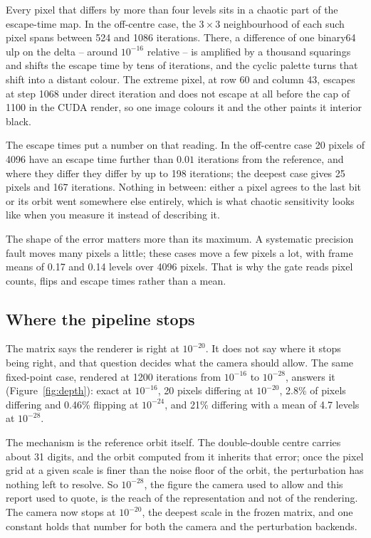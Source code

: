 \documentclass[10pt,a4paper]{article}
\begin{document}
Every pixel that differs by more than four levels sits in a chaotic part of the
escape-time map. In the off-centre case, the \(3\times3\) neighbourhood of each
such pixel spans between 524 and 1086 iterations. There, a difference of one
binary64 ulp on the delta -- around \(10^{-16}\) relative -- is amplified by a
thousand squarings and shifts the escape time by tens of iterations, and the
cyclic palette turns that shift into a distant colour. The extreme pixel, at
row 60 and column 43, escapes at step 1068 under direct iteration and does not
escape at all before the cap of 1100 in the CUDA render, so one image colours
it and the other paints it interior black.

The escape times put a number on that reading. In the off-centre case 20 pixels
of 4096 have an escape time further than \(0.01\) iterations from the
reference, and where they differ they differ by up to 198 iterations; the
deepest case gives 25 pixels and 167 iterations. Nothing in between: either a
pixel agrees to the last bit or its orbit went somewhere else entirely, which
is what chaotic sensitivity looks like when you measure it instead of
describing it.

The shape of the error matters more than its maximum. A systematic precision
fault moves many pixels a little; these cases move a few pixels a lot, with
frame means of 0.17 and 0.14 levels over 4096 pixels. That is why the gate
reads pixel counts, flips and escape times rather than a mean.

\subsection{Where the pipeline stops}
\label{sec:depth}

The matrix says the renderer is right at \(10^{-20}\). It does not say where it
stops being right, and that question decides what the camera should allow. The
same fixed-point case, rendered at 1200 iterations from \(10^{-16}\) to
\(10^{-28}\), answers it (Figure~\ref{fig:depth}): exact at \(10^{-16}\), 20
pixels differing at \(10^{-20}\), 2.8\% of pixels differing and 0.46\% flipping
at \(10^{-24}\), and 21\% differing with a mean of 4.7 levels at \(10^{-28}\).

The mechanism is the reference orbit itself. The double-double centre carries
about 31 digits, and the orbit computed from it inherits that error; once the
pixel grid at a given scale is finer than the noise floor of the orbit, the
perturbation has nothing left to resolve. So \(10^{-28}\), the figure the
camera used to allow and this report used to quote, is the reach of the
representation and not of the rendering. The camera now stops at \(10^{-20}\),
the deepest scale in the frozen matrix, and one constant holds that number for
both the camera and the perturbation backends.
\end{document}
